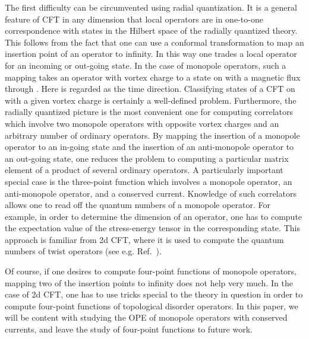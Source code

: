 \documentclass[a4paper,12pt, amsfonts, amssymb]{article}
\providecommand{\RR}{{\mathbb R}}
\begin{document}
The first difficulty can be circumvented using radial quantization. 
It is a general feature of CFT in any dimension that local operators
are in one-to-one correspondence with states in the Hilbert space of
the radially quantized theory. This follows from the fact that one
can use a conformal transformation to map an insertion point of an
operator to infinity. In this way one trades a local operator for
an incoming or out-going state. In the case of monopole operators,
such a mapping takes an operator with vortex charge \coordHE{} to a state on 
\myHighlight{${\bf S}^2\times \RR$}\coordHE{} with a magnetic flux \coordHE{} through \coordHE{}.
Here \myHighlight{$\RR$}\coordHE{} is regarded as the time direction.
Classifying states of a CFT on \myHighlight{${\bf S}^2\times \RR$}\coordHE{} with a given
vortex charge is certainly a well-defined problem. Furthermore,
the radially quantized picture is the most convenient one for
computing correlators which involve two monopole operators with
opposite vortex charges and an arbitrary number of ordinary operators. 
By mapping the insertion of
a monopole operator to an in-going state and the insertion of an anti-monopole
operator to an out-going state, one reduces the problem
to computing a particular matrix element of a product of several ordinary
operators. A particularly important
special case is the three-point function which
involves a monopole operator, an anti-monopole operator, and a 
conserved current. Knowledge of such correlators allows one
to read off the quantum numbers of a monopole operator. For example,
in order to determine the dimension of an operator, one has to
compute the expectation value of the stress-energy tensor in the
corresponding state. This approach is familiar from 2d CFT,
where it is used to compute the quantum numbers of twist 
operators (see e.g. Ref.~\cite{Ginsparg}). 

Of course, if one desires to compute four-point functions of monopole
operators, mapping two of the insertion points to infinity does not help 
very much. In the case of 2d CFT, one has to use tricks special to the theory in question in order to compute four-point functions of topological 
disorder operators. In this paper, we will be content with studying the OPE of monopole operators with conserved currents, and leave the study of four-point 
functions to future work.
\end{document}
